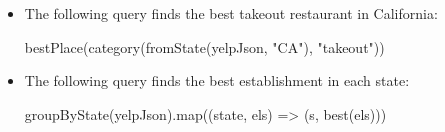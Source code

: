 \begin{itemize}
\item The following query finds the best takeout restaurant in California:
    \begin{scalacode}
    bestPlace(category(fromState(yelpJson, "CA"), "takeout"))
    \end{scalacode}

\item The following query finds the best establishment in each state:
    \begin{scalacode}
    groupByState(yelpJson).map((state, els) => (s, best(els)))
    \end{scalacode}
\end{itemize}


